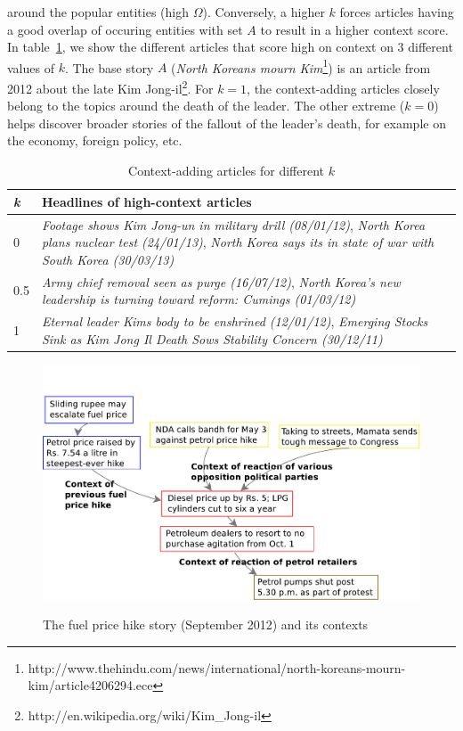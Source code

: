 around the popular entities (high $\Omega$). Conversely, a higher $k$ forces articles having a good overlap of occuring entities with set $A$ to result in a higher context score.
In table~\ref{tab:different-contexts}, we show the different articles that score high on context on 3 different values of $k$. The base story $A$ ({\em North Koreans mourn Kim}\footnote{http://www.thehindu.com/news/international/north-koreans-mourn-kim/article4206294.ece}) is an article from 2012 about the late Kim Jong-il\footnote{http://en.wikipedia.org/wiki/Kim\_Jong-il}. 
For $k=1$, the context-adding articles closely belong to the topics around the death of the leader. The other extreme ($k=0$) helps discover broader stories of the fallout of the leader's death, for example on the economy, foreign policy, etc.

\begin{table}
\small
\begin{tabular}{|l|p{7cm}|}
\hline
{\bf {\em k}} & {\bf Headlines of high-context articles}\\
\hline
0 & {\em Footage shows Kim Jong-un in military drill (08/01/12)}, {\em North Korea plans nuclear test (24/01/13)}, {\em North Korea says its in state of war with South Korea (30/03/13)}\\
\hline
0.5 & {\em Army chief removal seen as purge (16/07/12)}, {\em North Korea's new leadership is turning toward reform: Cumings (01/03/12)}\\
\hline
1 & {\em Eternal leader Kims body to be enshrined (12/01/12)}, {\em Emerging Stocks Sink as Kim Jong Il Death Sows Stability Concern (30/12/11)}\\
\hline
\end{tabular}
\caption{Context-adding articles for different $k$}
\label{tab:different-contexts}
\end{table}
\begin{figure}
\caption{The fuel price hike story (September 2012) and its contexts}
\includegraphics[scale=0.30]{figures/graph-petrol.pdf}
\label{fig:petrol}
\end{figure}

